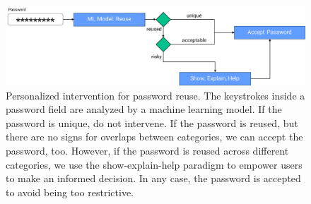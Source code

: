 \begin{figure}[htbp]
	\centering
	\includegraphics[width=\linewidth]{figures/summary/flow-chart}
	\caption{Personalized intervention for password reuse. The keystrokes inside a password field are analyzed by a machine learning model. If the password is unique, do not intervene. If the password is reused, but there are no signs for overlaps between categories, we can accept the password, too. However, if the password is reused across different categories, we use the show-explain-help paradigm to empower users to make an informed decision. In any case, the password is accepted to avoid being too restrictive. }
	\label{fig:summary:flow-chart}
\end{figure}

 



